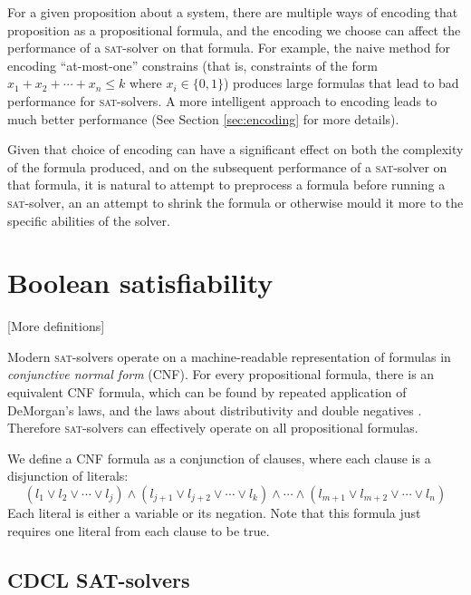 \documentclass[proof,pdftex,11pt,a4,titlepage]{article}
\newcommand{\sat}{\textsc{sat}}
\begin{document}
For a given proposition about a system, there are multiple ways of encoding that proposition as a propositional formula, and the encoding we choose can affect the performance of a \sat{}-solver on that formula. For example, the naive method for encoding ``at-most-one'' constrains (that is, constraints of the form $x_1 + x_2+ \cdots + x_n \leq k$ where $x_i \in \{0,1\}$) produces large formulas that lead to bad performance for \sat{}-solvers. A more intelligent approach to encoding leads to much better performance (See Section \ref{sec:encoding} for more details).

Given that choice of encoding can have a significant effect on both the complexity of the formula produced, and on the subsequent performance of a \sat{}-solver on that formula, it is natural to attempt to preprocess a formula before running a \sat{}-solver, an an attempt to shrink the formula or otherwise mould it more to the specific abilities of the solver.

\section{Boolean satisfiability}

[More definitions]

Modern \sat{}-solvers operate on a machine-readable representation of formulas in \emph{conjunctive normal form} (CNF). For every propositional formula, there is an equivalent CNF formula, which can be found by repeated application of DeMorgan's laws, and the laws about distributivity and double negatives \cite{Plaisted:1986}. Therefore \sat{}-solvers can effectively operate on all propositional formulas.

We define a CNF formula as a conjunction of clauses, where each clause is a disjunction of literals:
\[(l_1 \vee l_2 \vee \cdots \vee l_j) \wedge (l_{j+1} \vee l_{j+2} \vee \cdots \vee l_k) \wedge \cdots \wedge (l_{m+1} \vee l_{m+2} \vee \cdots \vee l_n)\]
Each literal is either a variable or its negation. Note that this formula just requires one literal from each clause to be true.

\subsection{CDCL SAT-solvers}
\end{document}
